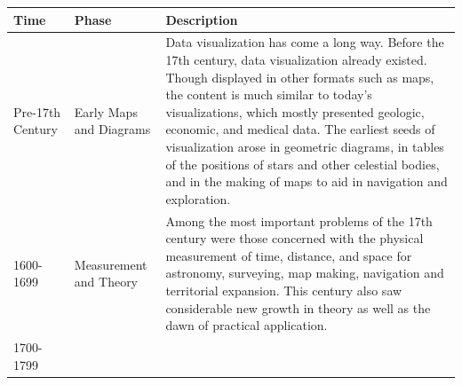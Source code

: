 \documentclass[]{book}
\begin{document}
\begin{longtable}[]{@{}lll@{}}
\toprule
\begin{minipage}[b]{0.11\columnwidth}\raggedright
\textbf{Time}\strut
\end{minipage} & \begin{minipage}[b]{0.11\columnwidth}\raggedright
\textbf{Phase}\strut
\end{minipage} & \begin{minipage}[b]{0.69\columnwidth}\raggedright
\textbf{Description}\strut
\end{minipage}\tabularnewline
\midrule
\endhead
\begin{minipage}[t]{0.11\columnwidth}\raggedright
Pre-17th Century\strut
\end{minipage} & \begin{minipage}[t]{0.11\columnwidth}\raggedright
Early Maps and Diagrams\strut
\end{minipage} & \begin{minipage}[t]{0.69\columnwidth}\raggedright
Data visualization has come a long way. Before the 17th century, data visualization already existed. Though displayed in other formats such as maps, the content is much similar to today's visualizations, which mostly presented geologic, economic, and medical data. The earliest seeds of visualization arose in geometric diagrams, in tables of the positions of stars and other celestial bodies, and in the making of maps to aid in navigation and exploration.\strut
\end{minipage}\tabularnewline
\begin{minipage}[t]{0.11\columnwidth}\raggedright
1600-1699\strut
\end{minipage} & \begin{minipage}[t]{0.11\columnwidth}\raggedright
Measurement and Theory\strut
\end{minipage} & \begin{minipage}[t]{0.69\columnwidth}\raggedright
Among the most important problems of the 17th century were those concerned with the physical measurement of time, distance, and space for astronomy, surveying, map making, navigation and territorial expansion. This century also saw considerable new growth in theory as well as the dawn of practical application.\strut
\end{minipage}\tabularnewline
\begin{minipage}[t]{0.11\columnwidth}\raggedright
1700-1799\strut
\end{minipage} & \begin{minipage}[t]{0.11\columnwidth}\raggedright

\end{minipage}
\end{longtable}
\end{document}
